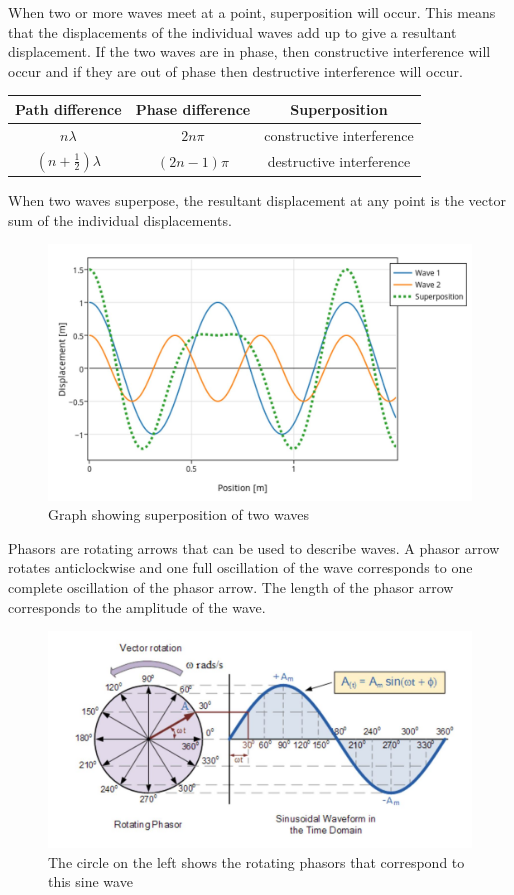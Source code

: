\documentclass[revision-guide.tex]{subfiles}
\begin{document}
When two or more waves meet at a point, superposition will occur. This means that the displacements of the individual waves add up to give a resultant displacement. If the two waves are in phase, then constructive interference will occur and if they are out of phase then destructive interference will occur.

\begin{center}
\begin{tabular}{c|c|c}
\textbf{Path difference} & \textbf{Phase difference} & \textbf{Superposition}\\
\hline
$n\lambda$ & $2n\pi$ & constructive interference\\
\hline
$(n+\frac{1}{2})\lambda$ & $(2n-1)\pi$ & destructive interference
\end{tabular}
\end{center}


When two waves superpose, the resultant displacement at any point is the vector sum of the individual displacements.

\begin{figure}[h!]
\centering
\includegraphics[width=10 cm]{figs/chapt-7/superposition.JPG}
\caption{Graph showing superposition of two waves}
\end{figure}

Phasors are rotating arrows that can be used to describe waves. A phasor arrow rotates anticlockwise and one full oscillation of the wave corresponds to one complete oscillation of the phasor arrow. The length of the phasor arrow corresponds to the amplitude of the wave. 

\begin{figure}[h]
\centering
\includegraphics[width=\textwidth]{figs/chapt-7/phasor.JPG}
\caption{The circle on the left shows the rotating phasors that correspond to this sine wave}
\end{figure}
\end{document}

